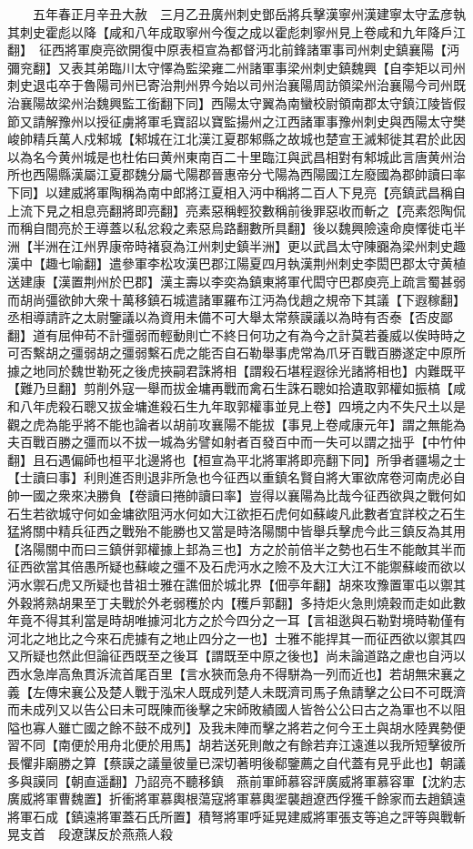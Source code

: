 　　五年春正月辛丑大赦　三月乙丑廣州刺史鄧岳將兵擊漢寧州漢建寧太守孟彦執其刺史霍彪以降【咸和八年成取寧州今復之成以霍彪刺寧州見上卷咸和九年降戶江翻】　征西將軍庾亮欲開復中原表桓宣為都督沔北前鋒諸軍事司州刺史鎮襄陽【沔彌兖翻】又表其弟臨川太守懌為監梁雍二州諸軍事梁州刺史鎮魏興【自李矩以司州刺史退屯卒于魯陽司州已寄治荆州界今始以司州治襄陽周訪領梁州治襄陽今司州既治襄陽故梁州治魏興監工銜翻下同】西陽太守翼為南蠻校尉領南郡太守鎮江陵皆假節又請解豫州以授征虜將軍毛寶詔以寶監揚州之江西諸軍事豫州刺史與西陽太守樊峻帥精兵萬人戍邾城【邾城在江北漢江夏郡邾縣之故城也楚宣王滅邾徙其君於此因以為名今黄州城是也杜佑曰黄州東南百二十里臨江與武昌相對有邾城此言唐黄州治所也西陽縣漢屬江夏郡魏分屬弋陽郡晉惠帝分弋陽為西陽國江左廢國為郡帥讀曰率下同】以建威將軍陶稱為南中郎將江夏相入沔中稱將二百人下見亮【亮鎮武昌稱自上流下見之相息亮翻將即亮翻】亮素惡稱輕狡數稱前後罪惡收而斬之【亮素怨陶侃而稱自間亮於王導蓋以私忿殺之素惡烏路翻數所具翻】後以魏興險遠命庾懌徙屯半洲【半洲在江州界康帝時褚裒為江州刺史鎮半洲】更以武昌太守陳嚻為梁州刺史趣漢中【趣七喻翻】遣參軍李松攻漢巴郡江陽夏四月執漢荆州刺史李閎巴郡太守黄植送建康【漢置荆州於巴郡】漢主壽以李奕為鎮東將軍代閎守巴郡庾亮上疏言蜀甚弱而胡尚彊欲帥大衆十萬移鎮石城遣諸軍羅布江沔為伐趙之規帝下其議【下遐稼翻】丞相導請許之太尉鑒議以為資用未備不可大舉太常蔡謨議以為時有否泰【否皮鄙翻】道有屈伸苟不計彊弱而輕動則亡不終日何功之有為今之計莫若養威以俟時時之可否繫胡之彊弱胡之彊弱繫石虎之能否自石勒舉事虎常為爪牙百戰百勝遂定中原所據之地同於魏世勒死之後虎挾嗣君誅將相【謂殺石堪程遐徐光諸將相也】内難既平【難乃旦翻】剪削外寇一舉而拔金墉再戰而禽石生誅石聰如拾遺取郭權如振槁【咸和八年虎殺石聰又拔金墉進殺石生九年取郭權事並見上卷】四境之内不失尺土以是觀之虎為能乎將不能也論者以胡前攻襄陽不能拔【事見上卷咸康元年】謂之無能為夫百戰百勝之彊而以不拔一城為劣譬如射者百發百中而一失可以謂之拙乎【中竹仲翻】且石遇偏師也桓平北邊將也【桓宣為平北將軍將即亮翻下同】所爭者疆場之士【士讀曰事】利則進否則退非所急也今征西以重鎮名賢自將大軍欲席卷河南虎必自帥一國之衆來决勝負【卷讀曰捲帥讀曰率】豈得以襄陽為比哉今征西欲與之戰何如石生若欲城守何如金墉欲阻沔水何如大江欲拒石虎何如蘇峻凡此數者宜詳校之石生猛將關中精兵征西之戰殆不能勝也又當是時洛陽關中皆舉兵擊虎今此三鎮反為其用【洛陽關中而曰三鎮併郭權據上邽為三也】方之於前倍半之勢也石生不能敵其半而征西欲當其倍愚所疑也蘇峻之彊不及石虎沔水之險不及大江大江不能禦蘇峻而欲以沔水禦石虎又所疑也昔祖士雅在譙佃於城北界【佃亭年翻】胡來攻豫置軍屯以禦其外穀將熟胡果至丁夫戰於外老弱穫於内【穫戶郭翻】多持炬火急則燒穀而走如此數年竟不得其利當是時胡唯據河北方之於今四分之一耳【言祖逖與石勒對境時勒僅有河北之地比之今來石虎據有之地止四分之一也】士雅不能捍其一而征西欲以禦其四又所疑也然此但論征西既至之後耳【謂既至中原之後也】尚未論道路之慮也自沔以西水急岸高魚貫泝流首尾百里【言水狹而急舟不得駢為一列而近也】若胡無宋襄之義【左傳宋襄公及楚人戰于泓宋人既成列楚人未既濟司馬子魚請擊之公曰不可既濟而未成列又以告公曰未可既陳而後擊之宋師敗績國人皆咎公公曰古之為軍也不以阻隘也寡人雖亡國之餘不鼓不成列】及我未陣而擊之將若之何今王土與胡水陸異勢便習不同【南便於用舟北便於用馬】胡若送死則敵之有餘若弃江遠進以我所短擊彼所長懼非廟勝之算【蔡謨之議量彼量已深切著明後郗鑒薦之自代蓋有見乎此也】朝議多與謨同【朝直遥翻】乃詔亮不聽移鎮　燕前軍師慕容評廣威將軍慕容軍【沈約志廣威將軍曹魏置】折衝將軍慕輿根蕩寇將軍慕輿埿襲趙遼西俘獲千餘家而去趙鎮遠將軍石成【鎮遠將軍蓋石氏所置】積弩將軍呼延晃建威將軍張支等追之評等與戰斬晃支首　段遼謀反於燕燕人殺